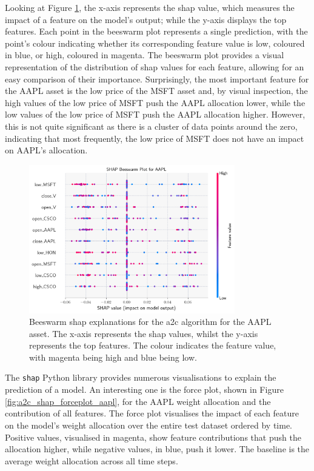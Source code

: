 Looking at Figure \ref{fig:a2c_shap_beeswarm_aapl}, the x-axis represents the \acrshort{shap} value, which measures the impact of a feature on the model's output; while the y-axis displays the top features. Each point in the beeswarm plot represents a single prediction, with the point's colour indicating whether its corresponding feature value is low, coloured in blue, or high, coloured in magenta. The beeswarm plot provides a visual representation of the distribution of \acrshort{shap} values for each feature, allowing for an easy comparison of their importance. Surprisingly, the most important feature for the AAPL asset is the low price of the MSFT asset and, by visual inspection, the high values of the low price of MSFT push the AAPL allocation lower, while the low values of the low price of MSFT push the AAPL allocation higher. However, this is not quite significant as there is a cluster of data points around the zero, indicating that most frequently, the low price of MSFT does not have an impact on AAPL's allocation. 

\begin{figure}
    \centering
    \includegraphics[width=0.8\textwidth]{figures/a2c_shap_beeswarm_aapl.png}
    \caption{Beeswarm \acrshort{shap} explanations for the \acrshort{a2c} algorithm for the AAPL asset. The x-axis represents the \acrshort{shap} values, whilst the y-axis represents the top features. The colour indicates the feature value, with magenta being high and blue being low.}
    \label{fig:a2c_shap_beeswarm_aapl}
\end{figure}

The \texttt{shap} Python library provides numerous visualisations to explain the prediction of a model. An interesting one is the force plot, shown in Figure \ref{fig:a2c_shap_forceplot_aapl}, for the AAPL weight allocation and the contribution of all features. The force plot visualises the impact of each feature on the model's weight allocation over the entire test dataset ordered by time. Positive values, visualised in magenta, show feature contributions that push the allocation higher, while negative values, in blue, push it lower. The baseline is the average weight allocation across all time steps. 

